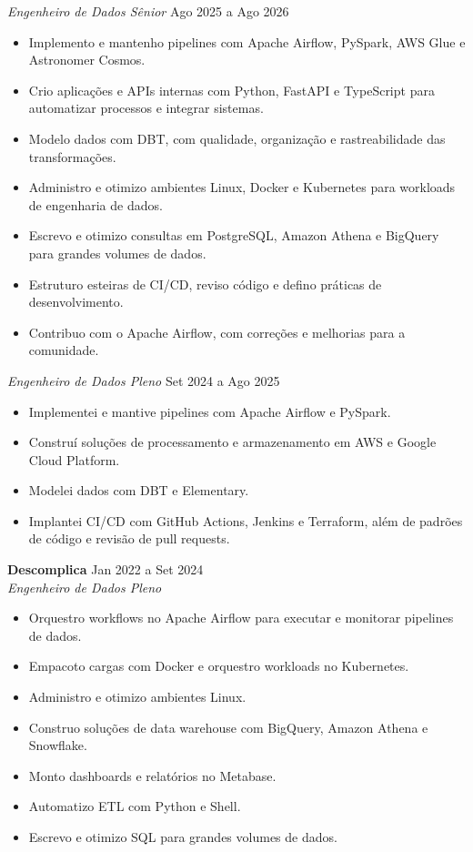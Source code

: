 \documentclass[a4paper,10pt]{article}
\begin{document}
\textit{Engenheiro de Dados Sênior} \hfill Ago 2025 a Ago 2026
\begin{itemize}
    \item Implemento e mantenho pipelines com Apache Airflow, PySpark, AWS Glue e Astronomer Cosmos.
    \item Crio aplicações e APIs internas com Python, FastAPI e TypeScript para automatizar processos e integrar sistemas.
    \item Modelo dados com DBT, com qualidade, organização e rastreabilidade das transformações.
    \item Administro e otimizo ambientes Linux, Docker e Kubernetes para workloads de engenharia de dados.
    \item Escrevo e otimizo consultas em PostgreSQL, Amazon Athena e BigQuery para grandes volumes de dados.
    \item Estruturo esteiras de CI/CD, reviso código e defino práticas de desenvolvimento.
    \item Contribuo com o Apache Airflow, com correções e melhorias para a comunidade.
\end{itemize}

\textit{Engenheiro de Dados Pleno} \hfill Set 2024 a Ago 2025
\begin{itemize}
    \item Implementei e mantive pipelines com Apache Airflow e PySpark.
    \item Construí soluções de processamento e armazenamento em AWS e Google Cloud Platform.
    \item Modelei dados com DBT e Elementary.
    \item Implantei CI/CD com GitHub Actions, Jenkins e Terraform, além de padrões de código e revisão de pull requests.
\end{itemize}

\textbf{Descomplica} \hfill Jan 2022 a Set 2024 \\
\textit{Engenheiro de Dados Pleno}
\begin{itemize}
    \item Orquestro workflows no Apache Airflow para executar e monitorar pipelines de dados.
    \item Empacoto cargas com Docker e orquestro workloads no Kubernetes.
    \item Administro e otimizo ambientes Linux.
    \item Construo soluções de data warehouse com BigQuery, Amazon Athena e Snowflake.
    \item Monto dashboards e relatórios no Metabase.
    \item Automatizo ETL com Python e Shell.
    \item Escrevo e otimizo SQL para grandes volumes de dados.
\end{itemize}
\end{document}
